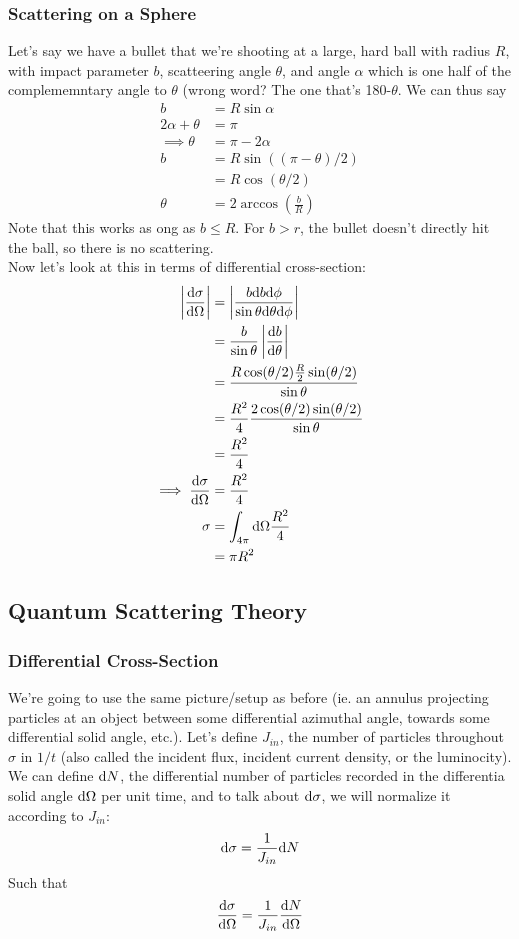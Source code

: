 \documentclass[a4paper]{article}
\begin{document}
\subsubsection{Scattering on a Sphere}
Let's say we have a bullet that we're shooting at a large, hard ball
with radius $R$, with impact parameter $b$, scatteering angle $\theta$,
and angle $\alpha$ which is one half of the complememntary angle to
$\theta$ (wrong word? The one that's 180-$\theta$. We can thus say
\begin{align*}
	b &= R\sin\alpha\\
	2\alpha+\theta&=\pi\\
	\implies \theta &= \pi-2\alpha\\
	b &= R\sin((\pi-\theta)/2)\\
	  &= R\cos(\theta/2)\\
	\theta &= 2\arccos\left(\frac{b}{R}\right)
\end{align*}
Note that this works as ong as $b\leq R$. For $b>r$, the bullet doesn't
directly hit the ball, so there is no scattering.\\
Now let's look at this in terms of differential cross-section:
\begin{align*}
	\left\lvert \frac{\mathrm{d} \sigma}{\mathrm{d} \Omega}\right\rvert &=
		\left\lvert \frac{b\mathrm{d} b\mathrm{d}\phi}{\sin\theta\mathrm{d}\theta\mathrm{d}\phi}\right\rvert\\
	&= \frac{b}{\sin\theta}\left\lvert \frac{\mathrm{d} b}{\mathrm{d} \theta}\right\rvert\\
	&= \frac{R\cos(\theta/2)\frac{R}{2}\sin(\theta/2)}{\sin\theta}\\
	&= \frac{R^2}{4}\frac{2\cos(\theta/2)\sin(\theta/2)}{\sin\theta}\\
	&= \frac{R^2}{4}\\
	\implies \frac{\mathrm{d} \sigma}{\mathrm{d} \Omega} &= \frac{R^2}{4}\\
	\sigma &= \int_{4\pi}\mathrm{d}\Omega\frac{R^2}{4}\\
	&= \pi R^2
\end{align*}

\subsection{Quantum Scattering Theory}
\subsubsection{Differential Cross-Section}
We're going to use the same picture/setup as before (ie. an annulus projecting
particles at an object between some differential azimuthal angle, towards some
differential solid angle, etc.). Let's define $J_{in}$, the number of
particles throughout $\sigma$ in $1/t$ (also called the incident flux, incident
current density, or the
luminocity). We can define $\mathrm{d} N$, the differential number of particles
recorded in the differentia solid angle $\mathrm{d}\Omega$ per unit time, and to talk
about $\mathrm{d}\sigma$, we will normalize it according to $J_{in}$:
\[
	\mathrm{d}\sigma = \frac{1}{J_{in}}\mathrm{d} N
\]
Such that
\[
	\frac{\mathrm{d} \sigma}{\mathrm{d} \Omega} = \frac{1}{J_{in}}\frac{\mathrm{d} N}{\mathrm{d} \Omega}
\]
\end{document}
